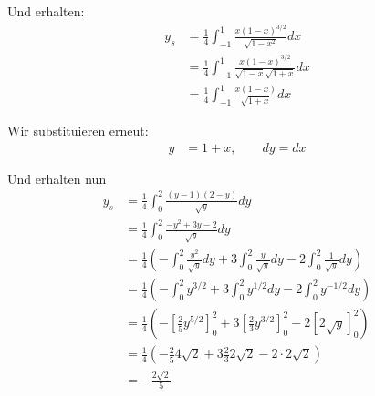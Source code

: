 \documentclass[a4paper,german,12pt,smallheadings]{scrartcl}
\begin{document}
\begin{enumerate}[a)]
    Und erhalten:
    \begin{align*}
      y_s &= \frac{1}{4} \int_{-1}^{1} \frac{x(1-x)^{3/2}}{\sqrt{1-x^2}} dx \\
          &= \frac{1}{4} \int_{-1}^{1} \frac{x(1-x)^{3/2}}{\sqrt{1-x}\sqrt{1+x}} dx \\
          &= \frac{1}{4} \int_{-1}^{1} \frac{x(1-x)}{\sqrt{1+x}} dx
    \end{align*}

    Wir substituieren erneut:
    \begin{align*}
      y &= 1+x, \qquad dy = dx
    \end{align*}

    Und erhalten nun
    \begin{align*}
      y_s &= \frac{1}{4} \int_{0}^{2} \frac{(y-1)(2-y)}{\sqrt{y}} dy \\
          &= \frac{1}{4} \int_{0}^{2} \frac{-y^2+3y-2}{\sqrt{y}} dy \\
          &= \frac{1}{4} \left(-\int_0^2 \frac{y^2}{\sqrt{y}} dy + 3 \int_0^2 \frac{y}{\sqrt{y}} dy - 2 \int_0^2 \frac{1}{\sqrt{y}} dy\right) \\
          &= \frac{1}{4} \left(-\int_0^2 y^{3/2} + 3 \int_0^2 y^{1/2} dy - 2 \int_0^2 y^{-1/2} dy\right) \\
          &= \frac{1}{4} \left(-\left[\frac{2}{5} y^{5/2}\right]_0^2 + 3 \left[\frac{2}{3} y^{3/2}\right]_0^2 - 2 \left[2\sqrt{y}\right]_0^2\right) \\
          &= \frac{1}{4} \left(-\frac{2}{5}4\sqrt{2} + 3 \frac{2}{3} 2 \sqrt{2} - 2 \cdot 2\sqrt{2}\right) \\
          &= - \frac{2\sqrt{2}}{5}
    \end{align*}



\end{enumerate}
\end{document}
